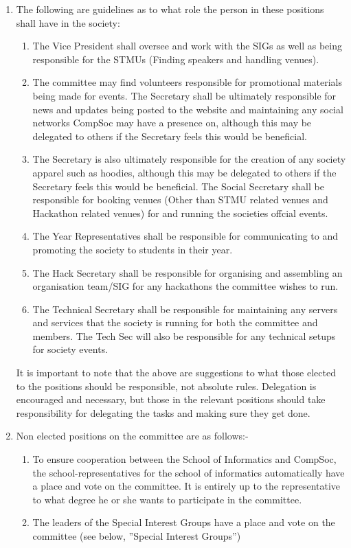 \documentclass[a4paper]{article}
\begin{document}
\begin {enumerate}
  \item The following are guidelines as to what role the person in these positions shall have in the society:
    \begin{enumerate}
      \item The Vice President shall oversee and work with the SIGs as well as
        being responsible for the STMUs (Finding speakers and handling venues).
      \item The committee may find volunteers responsible for promotional materials
        being made for events. The Secretary shall be ultimately
        responsible for news and updates being posted to the website and
        maintaining any social networks CompSoc may have a presence on,
        although this may be delegated to others if the Secretary feels this
        would be beneficial.
      \item The Secretary is also ultimately responsible for the creation of any
        society apparel such as hoodies, although this may be delegated to others
        if the Secretary feels this would be beneficial. The Social Secretary
        shall be responsible for booking venues (Other than STMU related venues 
        and Hackathon related venues) for and running the societies
        offcial events.
      \item The Year Representatives shall be responsible for communicating to
        and promoting the society to students in their year.
      \item The Hack Secretary shall be responsible for organising and assembling 
        an organisation team/SIG for any hackathons the committee wishes to run.
      \item The Technical Secretary shall be responsible for maintaining any servers
        and services that the society is running for both the committee and members.
        The Tech Sec will also be responsible for any technical setups for society events.
    \end{enumerate}

    It is important to note that the above are suggestions to what those elected
    to the positions should be responsible, not absolute rules. Delegation is
    encouraged and necessary, but those in the relevant positions should take
    responsibility for delegating the tasks and making sure they get done.
    
    \item Non elected positions on the committee are as follows:-
      \begin{enumerate}
        \item To ensure cooperation between the School of Informatics and CompSoc,
          the school-representatives for the school of informatics automatically
          have a place and vote on the committee. It is entirely up to
          the representative to what degree he or she wants to participate in
          the committee.
        \item The leaders of the Special Interest Groups have a place and vote on
          the committee (see below, ”Special Interest Groups”)
      \end{enumerate}


\end{enumerate}
\end{document}
